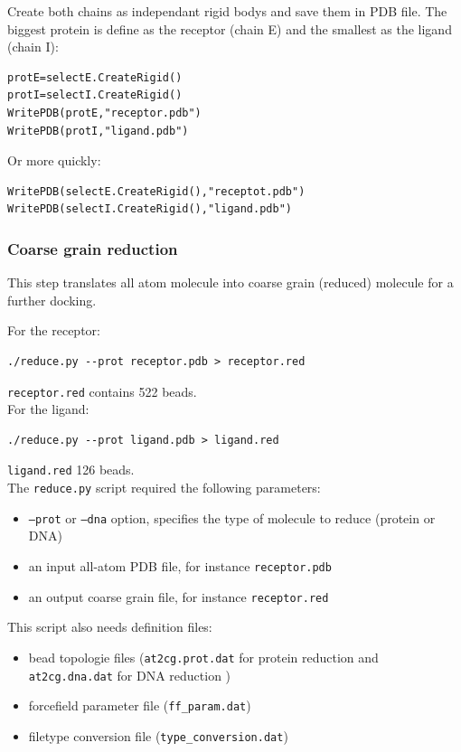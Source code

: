 \documentclass[12pt,a4paper]{article}
\begin{document}
Create both chains as independant rigid bodys and save them in PDB file. The biggest 
protein is define as the receptor (chain E) and the smallest as the ligand (chain I):

\begin{verbatim}
protE=selectE.CreateRigid()
protI=selectI.CreateRigid()
WritePDB(protE,"receptor.pdb")
WritePDB(protI,"ligand.pdb")
\end{verbatim}
Or more quickly:
\begin{verbatim}
WritePDB(selectE.CreateRigid(),"receptot.pdb")
WritePDB(selectI.CreateRigid(),"ligand.pdb")
\end{verbatim}

\subsubsection{Coarse grain reduction}

This step translates all atom molecule into coarse grain (reduced) molecule for a further docking. 

For the receptor: 
\begin{verbatim}
./reduce.py --prot receptor.pdb > receptor.red
\end{verbatim}
{\tt receptor.red} contains 522 beads.\\

For the ligand:
\begin{verbatim}
./reduce.py --prot ligand.pdb > ligand.red
\end{verbatim}
{\tt ligand.red} 126 beads. \\

The {\tt reduce.py} script required the following parameters:

\begin{itemize}
\item {\tt --prot} or {\tt --dna} option, specifies the type of molecule to reduce (protein or DNA)
\item an input all-atom PDB file, for instance {\tt receptor.pdb}
\item an output coarse grain file, for instance {\tt receptor.red}
\end{itemize}

This script also needs definition files:

\begin{itemize}
\item bead topologie files ({\tt at2cg.prot.dat} for protein reduction and {\tt at2cg.dna.dat} for DNA reduction )
\item forcefield parameter file ({\tt ff\_param.dat})
\item filetype conversion file ({\tt type\_conversion.dat})
\end{itemize}
\end{document}
